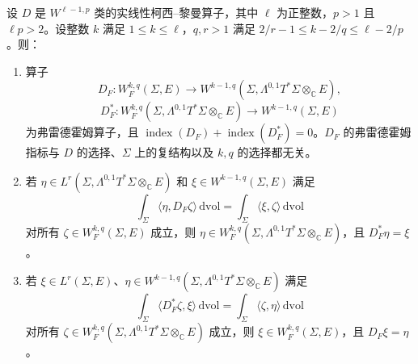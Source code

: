 \begin{theorem}\label{thm:C-2-3}
设 $D$ 是 $W^{\ell-1,p}$ 类的实线性柯西–黎曼算子，其中 $\ell$ 为正整数，$p>1$ 且 $\ell p>2$。设整数 $k$ 满足 $1\le k\le\ell$，$q,r>1$ 满足 $2/r-1\le k-2/q\le\ell-2/p$。则：
\begin{enumerate}[label=(\roman*)]
\item 算子
\[
  D_F:W_F^{k,q}(\Sigma,E)\to W^{k-1,q}(\Sigma,\Lambda^{0,1}T^*\Sigma\otimes_{\mathbb C}E),
\]
\[
  D_F^*:W_F^{k,q}(\Sigma,\Lambda^{0,1}T^*\Sigma\otimes_{\mathbb C}E)
  \to W^{k-1,q}(\Sigma,E)
\]
为弗雷德霍姆算子，且 $\operatorname{index}(D_F)+\operatorname{index}(D_F^*)=0$。$D_F$ 的弗雷德霍姆指标与 $D$ 的选择、$\Sigma$ 上的复结构以及 $k,q$ 的选择都无关。
\item 若 $\eta\in L^r(\Sigma,\Lambda^{0,1}T^*\Sigma\otimes_{\mathbb C}E)$ 和 $\xi\in W^{k-1,q}(\Sigma,E)$ 满足
\begin{equation}\label{eq:C-2-2}
  \int_\Sigma\langle\eta,D_F\zeta\rangle\,\mathrm{dvol}
  =\int_\Sigma\langle\xi,\zeta\rangle\,\mathrm{dvol}
\end{equation}
对所有 $\zeta\in W_F^{k,q}(\Sigma,E)$ 成立，则 $\eta\in W_F^{k,q}(\Sigma,\Lambda^{0,1}T^*\Sigma\otimes_{\mathbb C}E)$，且 $D_F^*\eta=\xi$。
\item 若 $\xi\in L^r(\Sigma,E)$、$\eta\in W^{k-1,q}(\Sigma,\Lambda^{0,1}T^*\Sigma\otimes_{\mathbb C}E)$ 满足
\begin{equation}\label{eq:C-2-3}
  \int_\Sigma\langle D_F^*\zeta,\xi\rangle\,\mathrm{dvol}
  =\int_\Sigma\langle\zeta,\eta\rangle\,\mathrm{dvol}
\end{equation}
对所有 $\zeta\in W_F^{k,q}(\Sigma,\Lambda^{0,1}T^*\Sigma\otimes_{\mathbb C}E)$ 成立，则 $\xi\in W_F^{k,q}(\Sigma,E)$，且 $D_F\xi=\eta$。
\end{enumerate}
\end{theorem}
